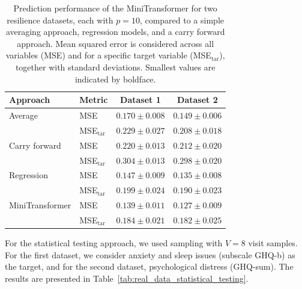 \documentclass[AMA,Times1COL]{WileyNJDv5} %
\begin{document}
\begin{table}[tb]
    \centering
    \footnotesize
    \caption{Prediction performance of the MiniTransformer for two resilience datasets, each with $p=10$, compared to a simple averaging approach, regression models, and a carry forward approach. Mean squared error is considered across all variables (MSE) and for a specific target variable (MSE$_{\mathrm{tar}}$), together with standard deviations. Smallest values are indicated by boldface.}
    \label{tab:real_data_comparison_with_baselines}
    \begin{tabular}{p{3.0cm}p{1.5cm}cc}
        \toprule
        \textbf{Approach} & \textbf{Metric} & Dataset 1 & Dataset 2 \\
        \midrule
        Average  & MSE  & $0.170 \pm 0.008$    & $0.149 \pm 0.006$    \\
                              & MSE$_{\mathrm{tar}}$ & $0.229 \pm 0.027$    & $0.208 \pm 0.018$    \\
        \addlinespace
        Carry forward   & MSE  & $0.220 \pm 0.013$    & $0.212 \pm 0.020$    \\
                              & MSE$_{\mathrm{tar}}$ & $0.304 \pm 0.013$    & $0.298 \pm 0.020$    \\
        \addlinespace
        Regression        & MSE  & $0.147 \pm 0.009$    & $0.135 \pm 0.008$    \\
                              & MSE$_{\mathrm{tar}}$ & $0.199 \pm 0.024$    & $0.190 \pm 0.023$    \\
        \addlinespace
        MiniTransformer   & MSE  & $\mathbf{0.139 \pm 0.011}$ & $\mathbf{0.127 \pm 0.009}$ \\
                              & MSE$_{\mathrm{tar}}$ & $\mathbf{0.184 \pm 0.021}$ & $\mathbf{0.182 \pm 0.025}$ \\
        \bottomrule
    \end{tabular}
\end{table}

For the statistical testing approach, we used sampling with  \(V = 8\) visit samples. For the first dataset, we consider anxiety and sleep issues (subscale GHQ-b) as the target, and for the second dataset, psychological distress (GHQ-sum). 
The results are presented in Table~\ref{tab:real_data_statistical_testing}. 
\end{document}
